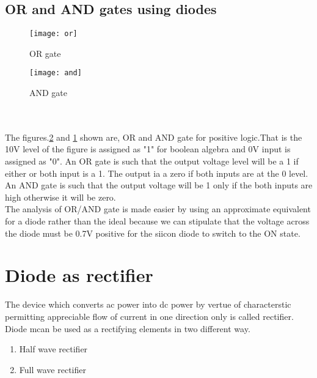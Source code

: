 \subsection{OR and AND gates using diodes}
\begin{minipage}{0.5\textwidth}
\begin{figure}[H]
	\centering
	\texttt{[image: or]}
	\caption{OR gate}
	\label{Diode OR gate}
	\end{figure}
\end{minipage}
\begin{minipage}{0.5\textwidth}
\begin{figure}[H]
	\centering
	\texttt{[image: and]}
	\caption{AND gate}
	\label{Diode AND gate}
\end{figure}
\end{minipage}\\\\
The figures.\ref{Diode AND gate} and \ref{Diode OR gate} shown are, OR and AND gate for positive logic.That is the 10V level of the figure is assigned as "1" for boolean algebra and 0V input is assigned as "0". An OR gate is such that the output voltage level will be a 1 if either or both input is a 1. The output ia a zero if both inputs are at the 0 level. An AND gate is such that the output voltage will be 1 only if the both inputs are high otherwise it will be zero.\\
The analysis of OR/AND gate is made easier by using an approximate equivalent for a diode rather than the ideal because we can stipulate that the voltage across the diode must be 0.7V positive for the siicon diode to switch to the ON state.
\section{Diode as rectifier}
The device which converts ac power into dc power by vertue of characterstic permitting appreciable flow of current in one direction only is called rectifier. Diode mcan be used as a rectifying elements in two different way.
\begin{enumerate}
	\item Half wave rectifier
	\item Full wave rectifier
\end{enumerate}
